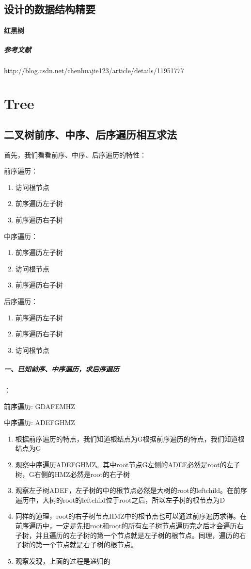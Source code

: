 \documentclass[UTF8,a4paper,12pt]{ctexbook}
\begin{document}
	\subsection{设计的数据结构精要}
		\paragraph{红黑树}
			\subparagraph{参考文献}http://blog.csdn.net/chenhuajie123/article/details/11951777
			
\section{Tree}
	\subsection{二叉树前序、中序、后序遍历相互求法}
		首先，我们看看前序、中序、后序遍历的特性： 
		
		前序遍历： 
		\begin{enumerate}[itemindent = 2em]
			\item 访问根节点 
			\item 前序遍历左子树 
			\item 前序遍历右子树
		\end{enumerate}
		
		中序遍历： 
		\begin{enumerate}[itemindent = 2em]
			\item 前序遍历左子树 
			\item 访问根节点 
			\item 前序遍历右子树
		\end{enumerate}
		
		后序遍历： 
		\begin{enumerate}[itemindent = 2em]
			\item 前序遍历左子树 
			\item 前序遍历右子树
			\item 访问根节点 
		\end{enumerate}
		
		\subparagraph{一、已知前序、中序遍历，求后序遍历}：
		
			前序遍历:         GDAFEMHZ
			
			中序遍历:         ADEFGHMZ
			
			\begin{enumerate}[itemindent = 1em]
				\item 根据前序遍历的特点，我们知道根结点为G根据前序遍历的特点，我们知道根结点为G
				\item 观察中序遍历ADEFGHMZ。其中root节点G左侧的ADEF必然是root的左子树，G右侧的HMZ必然是root的右子树
				\item 观察左子树ADEF，左子树的中的根节点必然是大树的root的leftchild。在前序遍历中，大树的root的leftchild位于root之后，所以左子树的根节点为D
				\item 同样的道理，root的右子树节点HMZ中的根节点也可以通过前序遍历求得。在前序遍历中，一定是先把root和root的所有左子树节点遍历完之后才会遍历右子树，并且遍历的左子树的第一个节点就是左子树的根节点。同理，遍历的右子树的第一个节点就是右子树的根节点。
				\item 观察发现，上面的过程是递归的
			\end{enumerate}
		
\end{document}
